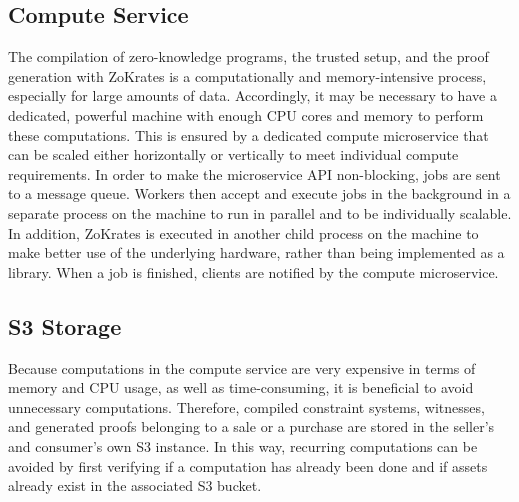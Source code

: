             
\subsection{Compute Service}
\label{subsec:compute}

The compilation of zero-knowledge programs, the trusted setup, and the proof generation with ZoKrates is a computationally and memory-intensive process, especially for large amounts of data. Accordingly, it may be necessary to have a dedicated, powerful machine with enough CPU cores and memory to perform these computations. This is ensured by a dedicated compute microservice that can be scaled either horizontally or vertically to meet individual compute requirements. In order to make the microservice API non-blocking, jobs are sent to a message queue. Workers then accept and execute jobs in the background in a separate process on the machine to run in parallel and to be individually scalable. In addition, ZoKrates is executed in another child process on the machine to make better use of the underlying hardware, rather than being implemented as a library. When a job is finished, clients are notified by the compute microservice.

\subsection{S3 Storage}
\label{subsec:s3}

Because computations in the compute service are very expensive in terms of memory and CPU usage, as well as time-consuming, it is beneficial to avoid unnecessary computations. Therefore, compiled constraint systems, witnesses, and generated proofs belonging to a sale or a purchase are stored in the seller's and consumer's own S3 instance. In this way, recurring computations can be avoided by first verifying if a computation has already been done and if assets already exist in the associated S3 bucket.

